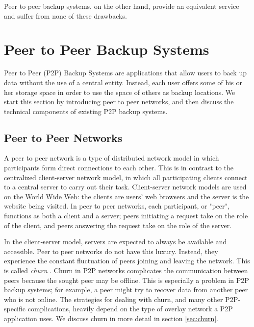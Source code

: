 \documentclass[12pt]{report}
\begin{document}
Peer to peer backup systems, on the other hand, provide an equivalent service and suffer from none of these drawbacks.

\section{Peer to Peer Backup Systems}

Peer to Peer (P2P) Backup Systems are applications that allow users to back up data without the use of a central entity. Instead, each user offers some of his or her storage space in order to use the space of others as backup locations. We start this section by introducing peer to peer networks, and then discuss the technical components of existing P2P backup systems.

\subsection{Peer to Peer Networks}

A peer to peer network is a type of distributed network model in which participants form direct connections to each other. This is in contrast to the centralized client-server network model, in which all participating clients connect to a central server to carry out their task. Client-server network models are used on the World Wide Web: the clients are users' web browsers and the server is the website being visited. In peer to peer networks, each participant, or "peer", functions as both a client and a server; peers initiating a request take on the role of the client, and peers answering the request take on the role of the server.

In the client-server model, servers are expected to always be available and accessible. Peer to peer networks do not have this luxury. Instead, they experience the constant fluctuation of peers joining and leaving the network. This is called \textit{churn} \cite{StorageSearchP2PNetworks}. Churn in P2P networks complicates the communication between peers because the sought peer may be offline. This is especially a problem in P2P backup systems; for example, a peer might try to recover data from another peer who is not online. The strategies for dealing with churn, and many other P2P-specific complications, heavily depend on the type of overlay network a P2P application uses. We discuss churn in more detail in section \ref{sec:churn}.

\end{document}
